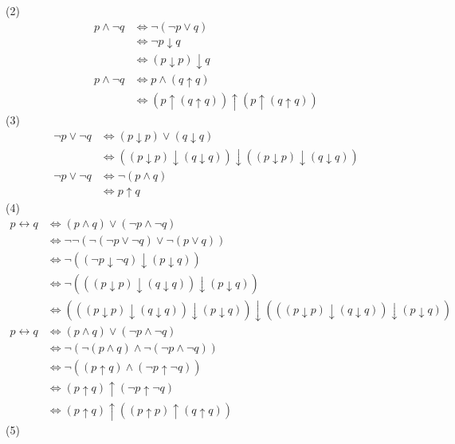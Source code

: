\documentclass{article}
\begin{document}
(2)
\[
\begin{aligned}
p \wedge \neg q & \iff \neg (\neg p \vee q) \\
                & \iff \neg p \downarrow q \\
                & \iff (p \downarrow p) \downarrow q \\
p \wedge \neg q & \iff p \wedge (q \uparrow q) \\
                & \iff (p \uparrow (q \uparrow q)) \uparrow (p \uparrow (q \uparrow q))
\end{aligned}    
\]
(3)
\[
\begin{aligned}
\neg p \vee \neg q & \iff (p \downarrow p) \vee (q \downarrow q) \\
                   & \iff ((p \downarrow p) \downarrow (q \downarrow q)) \downarrow ((p \downarrow p) \downarrow (q \downarrow q)) \\
\neg p \vee \neg q & \iff \neg (p \wedge q) \\
                   & \iff p \uparrow q
\end{aligned}    
\]
(4)
\[
\begin{aligned}
p \leftrightarrow q & \iff (p \wedge q) \vee (\neg p \wedge \neg q) \\
                    & \iff \neg \neg (\neg (\neg p \vee \neg q) \vee \neg (p \vee q)) \\
                    & \iff \neg ((\neg p \downarrow \neg q) \downarrow (p \downarrow q)) \\
                    & \iff \neg (((p \downarrow p) \downarrow (q \downarrow q)) \downarrow (p \downarrow q)) \\
                    & \iff (((p \downarrow p) \downarrow (q \downarrow q)) \downarrow (p \downarrow q)) \downarrow (((p \downarrow p) \downarrow (q \downarrow q)) \downarrow (p \downarrow q)) \\
p \leftrightarrow q & \iff (p \wedge q) \vee (\neg p \wedge \neg q) \\
                    & \iff \neg (\neg (p \wedge q) \wedge \neg (\neg p \wedge \neg q)) \\
                    & \iff \neg ((p \uparrow q) \wedge (\neg p \uparrow \neg q)) \\
                    & \iff (p \uparrow q) \uparrow (\neg p \uparrow \neg q) \\
                    & \iff (p \uparrow q) \uparrow ((p \uparrow p) \uparrow (q \uparrow q)) 
\end{aligned}    
\]
(5)
\end{document}
